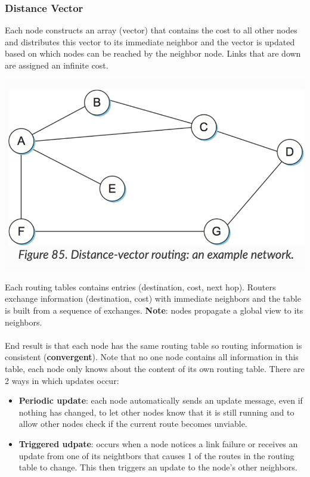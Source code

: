 \documentclass{article}
\begin{document}
  \subsubsection{Distance Vector}
  Each node constructs an array (vector) that contains the cost to all other nodes and distributes this vector to its immediate neighbor and the vector is updated based on which nodes can be reached by the neighbor node. Links that are down are assigned an infinite cost.
  \begin{center}
    \includegraphics[scale=0.5]{DistanceVector}
  \end{center}
  Each routing tables contains entries (destination, cost, next hop). Routers exchange information (destination, cost) with immediate neighbors and the table is built from a sequence of exchanges. \textbf{Note}: nodes propagate a global view to its neighbors.\\ \\
  End result is that each node has the same routing table so routing information is consistent (\textbf{convergent}). Note that no one node contains all information in this table, each node only knows about the content of its own routing table. There are 2 ways in which updates occur:
  \begin{itemize}
    \item \textbf{Periodic update}: each node automatically sends an update message, even if nothing has changed, to let other nodes know that it is still running and to allow other nodes check if the current route becomes unviable.
    \item \textbf{Triggered udpate}: occurs when a node notices a link failure or receives an update from one of its neightbors that causes 1 of the routes in the routing table to change. This then triggers an update to the node's other neighbors.
  \end{itemize}
\end{document}
